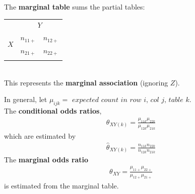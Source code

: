 \documentclass[11pt]{elegantbook}
\begin{document}
\begin{definition}
    \normalfont
    The \textbf{marginal table} sums the partial tables:
\end{definition}
\begin{table}[htbp]
    \centering
    \begin{tabular}{rllll}
        \multicolumn{1}{c}{}& \multicolumn{4}{c}{$Y$}\\
        \cline{2-5}
        \multicolumn{1}{r|}{\multirow{2}{*}{$X$}}&\multicolumn{2}{l|}{$n_{11+}$}&\multicolumn{2}{l|}{$n_{12+}$}\\
        \cline{2-5}
        \multicolumn{1}{r|}{}&\multicolumn{2}{l|}{$n_{21+}$}&\multicolumn{2}{l|}{$n_{22+}$}\\
        \cline{2-5}
        \multicolumn{1}{l}{}&&&&
    \end{tabular}\\
    This represents the \textbf{marginal association} (ignoring $Z$).
\end{table}
In general, let $\mu_{ijk}=\textit{ expected count in row i, col j, table k}$.\\
The \textbf{conditional odds ratios},
\begin{equation}
    \begin{aligned}
        \theta_{XY(k)}=\frac{\mu_{11k}\mu_{22k}}{\mu_{12k}\mu_{21k}}
    \end{aligned}
    \nonumber
\end{equation}
which are estimated by
\begin{equation}
    \begin{aligned}
        \hat{\theta}_{XY(k)}=\frac{n_{11k}n_{22k}}{n_{12k}n_{21k}}
    \end{aligned}
    \nonumber
\end{equation}
The \textbf{marginal odds ratio}
\begin{equation}
    \begin{aligned}
        \theta_{XY}=\frac{\mu_{11+}\mu_{22+}}{\mu_{12+}\mu_{21+}}
    \end{aligned}
    \nonumber
\end{equation}
is estimated from the marginal table.
\end{document}
